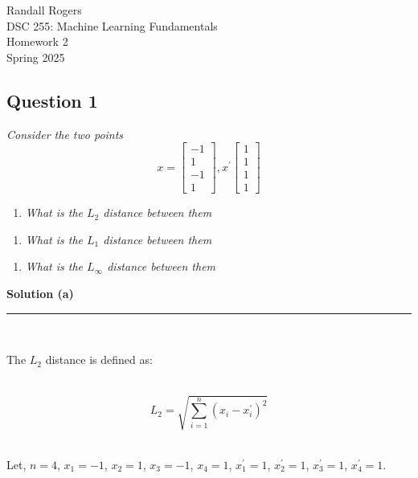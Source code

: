 \documentclass{article}
\begin{document}
\begin{flushright}
   Randall Rogers\\
   DSC 255: Machine Learning Fundamentals\\
   Homework 2 \\
   Spring 2025 \\
\end{flushright}

\subsection*{Question 1}
\textit{Consider the two points}\\

   $$
   x = 
   \begin{bmatrix}
   -1 \\
    1 \\
   -1 \\
    1
   \end{bmatrix},
   x^{\prime}
   \begin{bmatrix}
   1 \\
   1 \\
   1 \\
   1
   \end{bmatrix}
   $$

\begin{enumerate}[label=(a)]
  \item \textit{What is the $L_2$ distance between them}
\end{enumerate}

\begin{enumerate}[label=(b)]
  \item \textit{What is the $L_1$ distance between them}
\end{enumerate}

\begin{enumerate}[label=(c)]
  \item \textit{What is the $L_{\infty}$ distance between them}
\end{enumerate}

\textbf{Solution (a)}

\noindent\rule{\textwidth}{0.4pt}\\

\parbox{\textwidth}{The $L_2$ distance is defined as:}\\

$$L_2 = \sqrt{\sum_{i=1}^{n} (x_i - x^{\prime}_i)^2}$$\\

\parbox{\textwidth}{Let, $n = 4$, $x_1 = -1$, $x_2 = 1$, $x_3 = -1$, $x_4 = 1$, $x^{\prime}_1 = 1$, $x^{\prime}_2 = 1$, $x^{\prime}_3 = 1$, $x^{\prime}_4 = 1$.}\\
\end{document}
